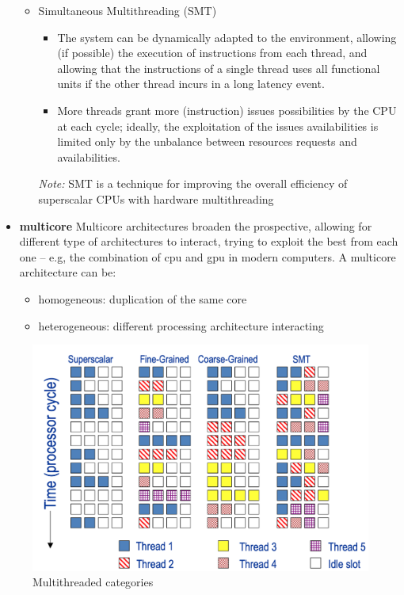 \begin{itemize}
\begin{itemize}
        \item Simultaneous Multithreading (SMT)
        \begin{itemize}
            \item The system can be dynamically adapted to the environment, allowing (if possible) the execution
            of instructions from each thread, and allowing that the instructions of a single thread uses all
            functional units if the other thread incurs in a long latency event.
            \item More threads grant more (instruction) issues possibilities by the CPU at each cycle;
            ideally, the exploitation of the issues availabilities is limited only by the unbalance between resources
            requests and availabilities.
        \end{itemize}
        \textit{Note:} SMT is a technique for improving the overall efficiency of superscalar CPUs with hardware
        multithreading
    \end{itemize}

    \item \textbf{multicore}
    Multicore architectures broaden the prospective, allowing for different type of architectures to interact, trying
    to exploit the best from each one -- e.g, the combination of cpu and gpu in modern computers.
    A multicore architecture can be:
    \begin{itemize}
        \item homogeneous: duplication of the same core
        \item heterogeneous: different processing architecture interacting
    \end{itemize}
\end{itemize}

\begin{figure}[h]
    \centering
    \includegraphics[scale=0.25]{images/multithreaded-categories}
    \caption{Multithreaded categories}
    \label{fig:multithreaded-categories}
\end{figure}

